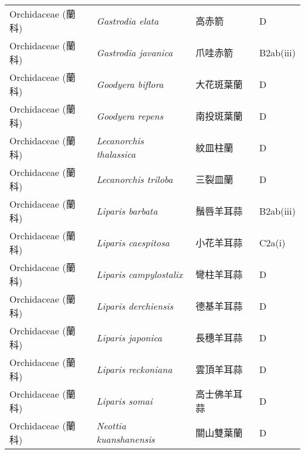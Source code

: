 \begin{longtable}{p{3cm}p{5cm}p{3cm}p{4cm}}
    Orchidaceae (蘭科) & \textit{Gastrodia elata}  & 高赤箭 & D \index{Gastrodia@\textit{Gastrodia}!elata@\textit{elata}}  \index{高赤箭} \\
    Orchidaceae (蘭科) & \textit{Gastrodia javanica}  & 爪哇赤箭 & B2ab(iii) \index{Gastrodia@\textit{Gastrodia}!javanica@\textit{javanica}}  \index{爪哇赤箭} \\
    Orchidaceae (蘭科) & \textit{Goodyera biflora}  & 大花斑葉蘭 & D \index{Goodyera@\textit{Goodyera}!biflora@\textit{biflora}}  \index{大花斑葉蘭} \\
    Orchidaceae (蘭科) & \textit{Goodyera repens}  & 南投斑葉蘭 & D \index{Goodyera@\textit{Goodyera}!repens@\textit{repens}}  \index{南投斑葉蘭} \\
    Orchidaceae (蘭科) & \textit{Lecanorchis thalassica}  & 紋皿柱蘭 & D \index{Lecanorchis@\textit{Lecanorchis}!thalassica@\textit{thalassica}}  \index{紋皿柱蘭} \\
    Orchidaceae (蘭科) & \textit{Lecanorchis triloba}  & 三裂皿蘭 & D \index{Lecanorchis@\textit{Lecanorchis}!triloba@\textit{triloba}}  \index{三裂皿蘭} \\
    Orchidaceae (蘭科) & \textit{Liparis barbata}  & 鬚唇羊耳蒜 & B2ab(iii) \index{Liparis@\textit{Liparis}!barbata@\textit{barbata}}  \index{鬚唇羊耳蒜} \\
    Orchidaceae (蘭科) & \textit{Liparis caespitosa}  & 小花羊耳蒜 & C2a(i) \index{Liparis@\textit{Liparis}!caespitosa@\textit{caespitosa}}  \index{小花羊耳蒜} \\
    Orchidaceae (蘭科) & \textit{Liparis campylostalix}  & 彎柱羊耳蒜 & D \index{Liparis@\textit{Liparis}!campylostalix@\textit{campylostalix}}  \index{彎柱羊耳蒜} \\
    Orchidaceae (蘭科) & \textit{Liparis derchiensis}  & 德基羊耳蒜 & D \index{Liparis@\textit{Liparis}!derchiensis@\textit{derchiensis}}  \index{德基羊耳蒜} \\
    Orchidaceae (蘭科) & \textit{Liparis japonica}  & 長穗羊耳蒜 & D \index{Liparis@\textit{Liparis}!japonica@\textit{japonica}}  \index{長穗羊耳蒜} \\
    Orchidaceae (蘭科) & \textit{Liparis reckoniana}  & 雲頂羊耳蒜 & D \index{Liparis@\textit{Liparis}!reckoniana@\textit{reckoniana}}  \index{雲頂羊耳蒜} \\
    Orchidaceae (蘭科) & \textit{Liparis somai}  & 高士佛羊耳蒜 & D \index{Liparis@\textit{Liparis}!somai@\textit{somai}}  \index{高士佛羊耳蒜} \\
    Orchidaceae (蘭科) & \textit{Neottia kuanshanensis}  & 關山雙葉蘭 & D \index{Neottia@\textit{Neottia}!kuanshanensis@\textit{kuanshanensis}}  \index{關山雙葉蘭} \\

\end{longtable}
